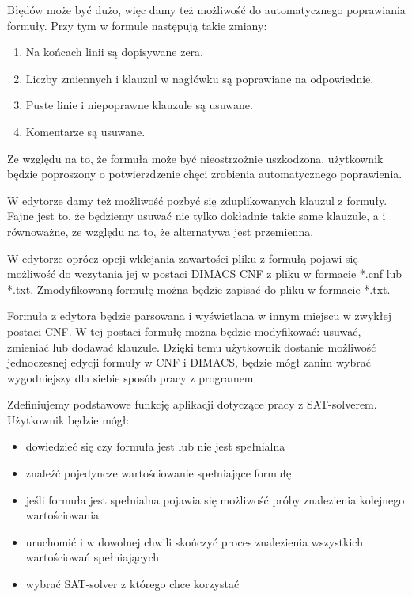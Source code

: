 \documentclass[a4paper,12pt,oneside]{book}
\theoremstyle{definition}
\begin{document}
Błędów może być dużo, więc damy też możliwość do automatycznego poprawiania formuły. Przy tym w formule następują takie zmiany:

\begin{enumerate}
    \item Na końcach linii są dopisywane zera.
    \item Liczby zmiennych i klauzul w nagłówku są poprawiane na odpowiednie.
    \item Puste linie i niepoprawne klauzule są usuwane.
    \item Komentarze są usuwane.
\end{enumerate}

\noindent Ze względu na to, że formuła może być nieostrzożnie uszkodzona, użytkownik będzie poproszony o potwierzdzenie chęci zrobienia automatycznego poprawienia.

W edytorze damy też możliwość pozbyć się zduplikowanych klauzul z formuły. Fajne jest to, że będziemy usuwać nie tylko dokładnie takie same klauzule, a i równoważne, ze względu na to, że alternatywa jest przemienna.

W edytorze oprócz opcji wklejania zawartości pliku z formułą pojawi się możliwość do wczytania jej w postaci DIMACS CNF z pliku w formacie *.cnf lub *.txt. Zmodyfikowaną formułę można będzie zapisać do pliku w formacie *.txt.

Formuła z edytora będzie parsowana i wyświetlana w innym miejscu w zwykłej postaci CNF. W tej postaci formułę można będzie modyfikować: usuwać, zmieniać lub dodawać klauzule. Dzięki temu użytkownik dostanie możliwość jednoczesnej edycji formuły w CNF i DIMACS, będzie mógł zanim wybrać wygodniejszy dla siebie sposób pracy z programem.

Zdefiniujemy podstawowe funkcję aplikacji dotyczące pracy z SAT-solverem. Użytkownik będzie mógł:

\begin{itemize}
    \item dowiedzieć się czy formuła jest lub nie jest spełnialna
    \item znaleźć pojedyncze wartościowanie spełniające formułę
    \item jeśli formuła jest spełnialna pojawia się możliwość próby znalezienia kolejnego wartościowania 
    \item uruchomić i w dowolnej chwili skończyć proces znalezienia wszystkich wartościowań spełniających
    \item wybrać SAT-solver z którego chce korzystać
\end{itemize}
\end{document}
